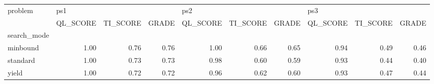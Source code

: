 \begin{tabular}{lrrrrrrrrr}
\toprule
problem & \multicolumn{3}{l}{ps1} & \multicolumn{3}{l}{ps2} & \multicolumn{3}{l}{ps3} \\
{} & QL\_SCORE & TI\_SCORE & GRADE & QL\_SCORE & TI\_SCORE & GRADE & QL\_SCORE & TI\_SCORE & GRADE \\
search\_mode &          &          &       &          &          &       &          &          &       \\
\midrule
minbound    &     1.00 &     0.76 &  0.76 &     1.00 &     0.66 &  0.65 &     0.94 &     0.49 &  0.46 \\
standard    &     1.00 &     0.73 &  0.73 &     0.98 &     0.60 &  0.59 &     0.93 &     0.44 &  0.40 \\
yield       &     1.00 &     0.72 &  0.72 &     0.96 &     0.62 &  0.60 &     0.93 &     0.47 &  0.44 \\
\bottomrule
\end{tabular}
